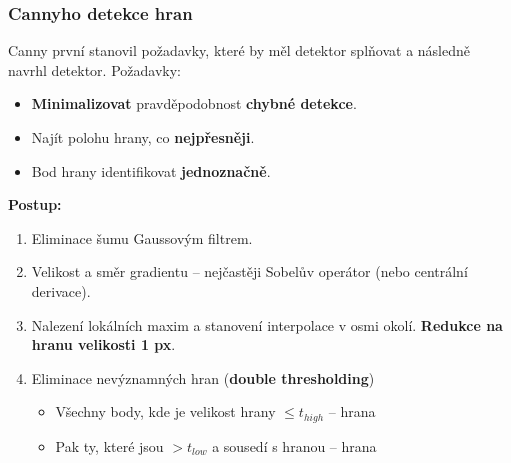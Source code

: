 \subsubsection{Cannyho detekce hran}
Canny první stanovil požadavky, které by měl detektor splňovat a následně navrhl detektor. %
Požadavky:
\begin{itemize}
	\item \textbf{Minimalizovat} pravděpodobnost \textbf{chybné detekce}.
	\item Najít polohu hrany, co \textbf{nejpřesněji}.
	\item Bod hrany identifikovat \textbf{jednoznačně}.
\end{itemize}
\textbf{Postup:}
\begin{enumerate}
	\item Eliminace šumu Gaussovým filtrem.
	\item Velikost a směr gradientu -- nejčastěji Sobelův operátor (nebo centrální derivace).
	\item Nalezení lokálních maxim a stanovení interpolace v osmi okolí. \textbf{Redukce na hranu velikosti 1 px}.
	\item Eliminace nevýznamných hran (\textbf{double thresholding})
	\begin{itemize}
		\item Všechny body, kde je velikost hrany $\leq t_{high}$ --  hrana
		\item Pak ty, které jsou $ > t_{low}$ a sousedí s hranou --  hrana
	\end{itemize}
\end{enumerate}

